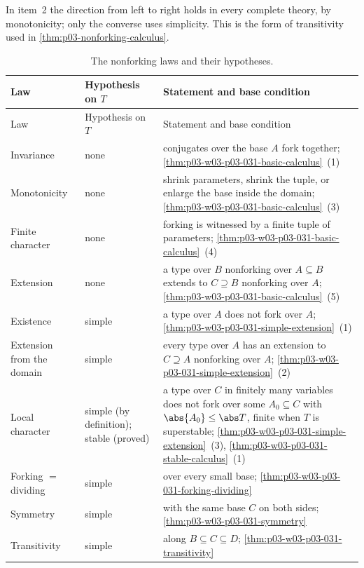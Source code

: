 In item~2 the direction from left to right holds in every complete theory,
by monotonicity; only the converse uses simplicity.  This is the form of
transitivity used in \cref{thm:p03-nonforking-calculus}.

\begin{longtable}{@{}p{}p{}p{}@{}}
\caption{The nonforking laws and their hypotheses.}\label{tab:p03-w03-p03-031-calculus}\\
\toprule
Law & Hypothesis on \(T\) & Statement and base condition \\
\midrule
\endfirsthead
\toprule
Law & Hypothesis on \(T\) & Statement and base condition \\
\midrule
\endhead
Invariance & none & conjugates over the base \(A\) fork together;
\cref{thm:p03-w03-p03-031-basic-calculus}~(1) \\
Monotonicity & none & shrink parameters, shrink the tuple, or enlarge the
base inside the domain; \cref{thm:p03-w03-p03-031-basic-calculus}~(3) \\
Finite character & none & forking is witnessed by a finite tuple of
parameters; \cref{thm:p03-w03-p03-031-basic-calculus}~(4) \\
Extension & none & a type over \(B\) nonforking over \(A\subseteq B\)
extends to \(C\supseteq B\) nonforking over \(A\);
\cref{thm:p03-w03-p03-031-basic-calculus}~(5) \\
Existence & simple & a type over \(A\) does not fork over \(A\);
\cref{thm:p03-w03-p03-031-simple-extension}~(1) \\
Extension from the domain & simple & every type over \(A\) has an extension
to \(C\supseteq A\) nonforking over \(A\);
\cref{thm:p03-w03-p03-031-simple-extension}~(2) \\
Local character & simple (by definition); stable (proved) & a type over
\(C\) in finitely many variables does not fork over some
\(A_0\subseteq C\) with \(\abs{A_0}\leq\abs T\), finite when \(T\) is
superstable; \cref{thm:p03-w03-p03-031-simple-extension}~(3),
\cref{thm:p03-w03-p03-031-stable-calculus}~(1) \\
Forking \(=\) dividing & simple & over every small base;
\cref{thm:p03-w03-p03-031-forking-dividing} \\
Symmetry & simple & with the same base \(C\) on both sides;
\cref{thm:p03-w03-p03-031-symmetry} \\
Transitivity & simple & along \(B\subseteq C\subseteq D\);
\cref{thm:p03-w03-p03-031-transitivity} \\
\bottomrule
\end{longtable}

